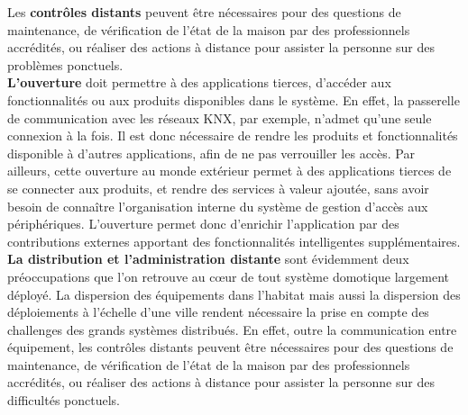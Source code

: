 Les {\bf contrôles distants} peuvent être nécessaires pour des questions de maintenance, de vérification de l'état de la maison par des professionnels accrédités, ou réaliser des actions à distance pour assister la personne sur des problèmes ponctuels.\\




{\bf L'ouverture} doit permettre à des applications tierces, d'accéder aux fonctionnalités ou aux produits disponibles dans le système. En effet, la passerelle de communication avec les réseaux KNX, par exemple, n'admet qu'une seule connexion à la fois. Il est donc nécessaire de rendre les produits et fonctionnalités disponible à d'autres applications, afin de ne pas verrouiller les accès. Par ailleurs, cette ouverture au monde extérieur permet à des applications tierces de se connecter aux produits, et rendre des services à valeur ajoutée, sans avoir besoin de connaître l'organisation interne du système de gestion d'accès aux périphériques. L'ouverture permet donc d'enrichir l'application par des contributions externes apportant des fonctionnalités intelligentes supplémentaires.\\

{\bf La distribution et l'administration distante} sont évidemment deux préoccupations que l'on retrouve au c\oe ur de tout système domotique largement déployé. La dispersion des équipements dans l'habitat mais aussi la dispersion des déploiements à l'échelle d'une ville rendent nécessaire la prise en compte des challenges des grands systèmes distribués.  En effet, outre la communication entre équipement, les contrôles distants peuvent être nécessaires pour des questions de maintenance, de vérification de l'état de la maison par des professionnels accrédités, ou réaliser des actions à distance pour assister la personne sur des difficultés ponctuels.\\


